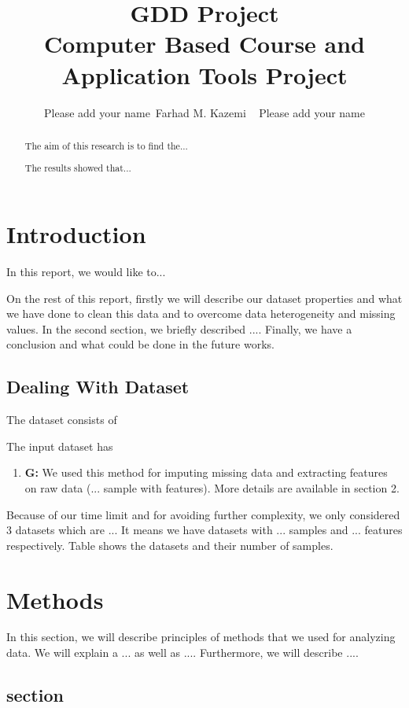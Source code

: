 \documentclass[12pt,letterpaper]{article}
\begin{document}
\title{GDD Project \\ \vspace{.5 cm} {\Large Computer Based Course and Application Tools Project} }
\author{Please add your name~Farhad M. Kazemi ~ Please add your name}
\maketitle
\begin{abstract}
The aim of this research is to find the...

The results showed that...
\end{abstract}

\section{Introduction}

In this report, we would like to...

On the rest of this report, firstly we will describe our dataset properties and what we have done to clean this data and to overcome data heterogeneity and missing values. In the second section, we briefly described ....
Finally, we have a conclusion and what could be done in the future works.
\subsection{Dealing With Dataset}
The dataset consists of 

The input dataset has 
\begin{enumerate}
\item \textbf{G:} We used this method for imputing missing data and extracting features on raw data (... sample with features). More details are available in section 2.
\end{enumerate}
\noindent Because of our time limit and for avoiding further complexity, we only considered 3 datasets which are ... 
It means we have datasets with ... samples and ... features respectively. Table shows the datasets and their number of samples.
\section{Methods}
In this section, we will describe principles of methods that we used for analyzing data. We will explain a ... as well as ....  Furthermore, we will describe .... 
\subsection{ section}
\end{document}
